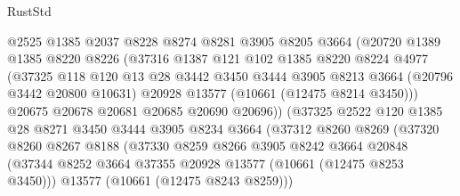 \begin{lexlean}{RustStd}
\begin{coremodule}
                      @2525
                      @1385
                      @2037
                      @8228
                      @8274
                      @8281
                      @3905
                      @8205
                      @3664
                      (@20720
                        @1389
                        @1385
                        @8220
                        @8226
                        (@37316
                          @1387
                          @121
                          @102
                          @1385
                          @8220
                          @8224
                          @4977
                          (@37325
                            @118
                            @120
                            @13
                            @28
                            @3442
                            @3450
                            @3444
                            @3905
                            @8213
                            @3664
                            (@20796 @3442 @20800 @10631)
                            @20928
                            @13577
                            (@10661 (@12475 @8214 @3450)))
                          @20675
                          @20678
                          @20681
                          @20685
                          @20690
                          @20696))
                      (@37325
                        @2522
                        @120
                        @1385
                        @28
                        @8271
                        @3450
                        @3444
                        @3905
                        @8234
                        @3664
                        (@37312
                          @8260
                          @8269
                          (@37320
                            @8260
                            @8267
                            @8188
                            (@37330
                              @8259
                              @8266
                              @3905
                              @8242
                              @3664
                              @20848
                              (@37344
                                @8252
                                @3664
                                @37355
                                @20928
                                @13577
                                (@10661 (@12475 @8253 @3450)))
                              @13577
                              (@10661 (@12475 @8243 @8259)))

\end{coremodule}
\end{lexlean}
